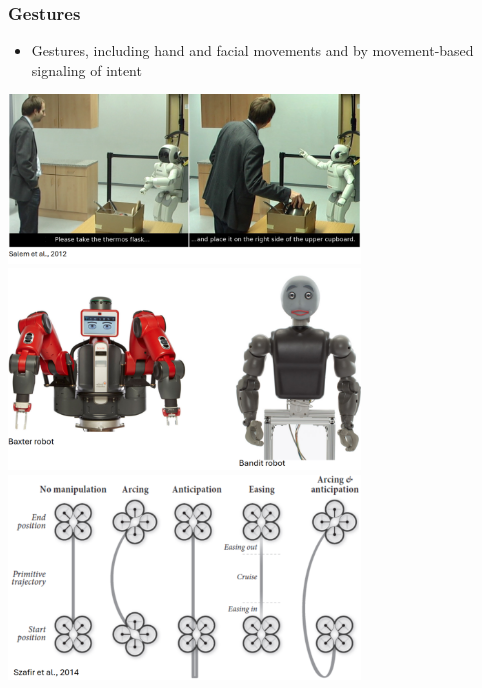 \documentclass[10pt]{article}
\begin{document}
\subsubsection*{Gestures}
\begin{itemize}
	\item Gestures, including hand and facial movements and by movement-based signaling of intent
\end{itemize}
\begin{center} 
	\includegraphics*[width=0.7\textwidth]{L1_4.png} \\
    \includegraphics*[width=0.7\textwidth]{L1_5.png} \\
    \includegraphics*[width=0.7\textwidth]{L1_6.png} \\
\end{center}
\end{document}
